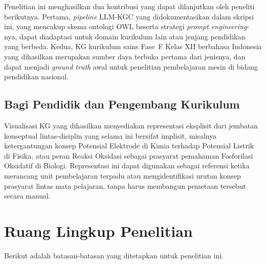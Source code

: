 \documentclass[main]{subfiles}
\begin{document}
Penelitian ini menghasilkan dua kontribusi yang dapat dilanjutkan oleh peneliti
berikutnya. Pertama, \textit{pipeline} LLM-KGC yang didokumentasikan dalam
skripsi ini, yang mencakup skema ontologi OWL beserta strategi
\textit{prompt engineering}-nya, dapat diadaptasi untuk domain kurikulum lain
atau jenjang pendidikan yang berbeda. Kedua, KG kurikulum sains Fase~F Kelas XII berbahasa Indonesia
yang dihasilkan merupakan sumber daya terbuka pertama dari jenisnya, dan dapat
menjadi \textit{ground truth} awal untuk penelitian pembelajaran mesin di bidang
pendidikan nasional.

\subsection{Bagi Pendidik dan Pengembang Kurikulum}

Visualisasi KG yang dihasilkan menyediakan representasi eksplisit dari jembatan
konseptual lintas-disiplin yang selama ini bersifat implisit, misalnya
ketergantungan konsep Potensial Elektrode di Kimia terhadap Potensial Listrik di
Fisika, atau peran Reaksi Oksidasi sebagai prasyarat pemahaman Fosforilasi
Oksidatif di Biologi. Representasi ini dapat digunakan sebagai referensi ketika
merancang unit pembelajaran terpadu atau mengidentifikasi urutan konsep prasyarat
lintas mata pelajaran, tanpa harus membangun pemetaan tersebut secara manual.

\section{Ruang Lingkup Penelitian}
\label{sec:ruang-lingkup}

Berikut adalah batasan-batasan yang ditetapkan untuk penelitian ini.
\end{document}
